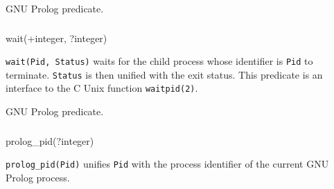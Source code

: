 \Portability

GNU Prolog predicate.

\subsubsection{\label{wait/2}}

\begin{TemplatesOneCol}
wait(+integer, ?integer)

\end{TemplatesOneCol}

\Description

\texttt{wait(Pid, Status)} waits for the child process whose identifier is
\texttt{Pid} to terminate. \texttt{Status} is then unified with the exit
status. This predicate is an interface to the C Unix function
\texttt{waitpid(2)}.

\begin{PlErrors}





\end{PlErrors}

\Portability

GNU Prolog predicate.

\subsubsection{}

\begin{TemplatesOneCol}
prolog\_pid(?integer)

\end{TemplatesOneCol}

\Description

\texttt{prolog\_pid(Pid)} unifies \texttt{Pid} with the process identifier
of the current GNU Prolog process.

\begin{PlErrors}


\end{PlErrors}

